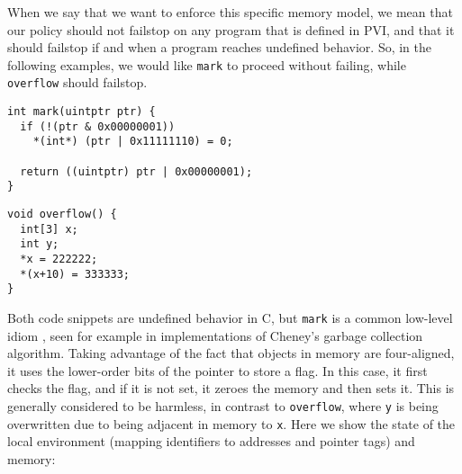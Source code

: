 \documentclass{llncs}
\begin{document}
When we say that we want to enforce this specific memory model, we mean that our policy should
not failstop on any program that is defined in PVI, and that it should failstop if and when a program
reaches undefined behavior. So, in the following examples, we would like {\tt mark} to proceed without
failing, while {\tt overflow} should failstop.

\begin{minipage}{0.65\textwidth}
\begin{verbatim}
int mark(uintptr ptr) {
  if (!(ptr & 0x00000001))
    *(int*) (ptr | 0x11111110) = 0;

  return ((uintptr) ptr | 0x00000001);
}
\end{verbatim}
\end{minipage}
\begin{minipage}{0.34\textwidth}
\begin{verbatim}
void overflow() {
  int[3] x;
  int y;
  *x = 222222;
  *(x+10) = 333333;
}
\end{verbatim}
\end{minipage}

Both code snippets are undefined behavior in C, but {\tt mark} is a common low-level
idiom \cite{Memarian16:DeFacto}, seen for example in implementations of Cheney's garbage collection algorithm.
Taking advantage of the fact that objects in memory are four-aligned, it
uses the lower-order bits of the pointer to store a flag. In this case, it first checks
the flag, and if it is not set, it zeroes the memory and then sets it. This is generally
considered to be harmless, in contrast to {\tt overflow}, where {\tt y} is being overwritten
due to being adjacent in memory to {\tt x}. Here we show the state of the local environment
(mapping identifiers to addresses and pointer tags) and memory:
\end{document}
